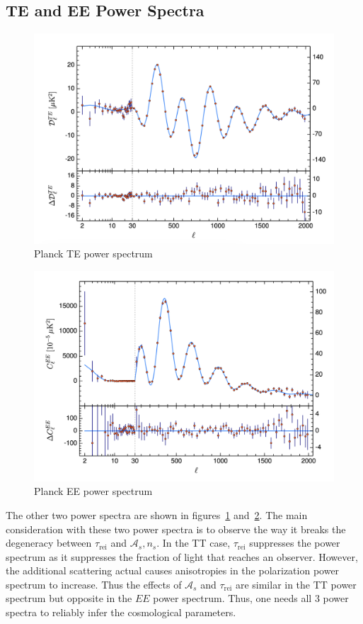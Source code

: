 \subsection{TE and EE Power Spectra}
\begin{figure}
    \centering
    \includegraphics[width=12cm]{plots/planck_TE.png}
    \caption{Planck TE power spectrum}
    \label{fig:planck_te}
\end{figure}
\begin{figure}
    \centering
    \includegraphics[width=12cm]{plots/planck_EE.png}
    \caption{Planck EE power spectrum}
    \label{fig:planck_ee}
\end{figure}
The other two power spectra are shown in figures~\ref{fig:planck_te} and~\ref{fig:planck_ee}. The main consideration with these two power spectra is to observe the way it breaks the degeneracy between $\tau_\mathrm{rei}$ and $\mathcal{A}_s,n_s$. In the TT case,  $\tau_{\mathrm{rei}}$ suppresses the power spectrum as it suppresses the fraction of light that reaches an observer. However, the additional scattering actual causes anisotropies in the polarization power spectrum to increase. Thus the effects of $\mathcal{A}_s$ and $\tau_\mathrm{rei}$ are similar in the TT power spectrum but opposite in the $EE$ power spectrum. Thus, one needs all 3 power spectra to reliably infer the cosmological parameters.
